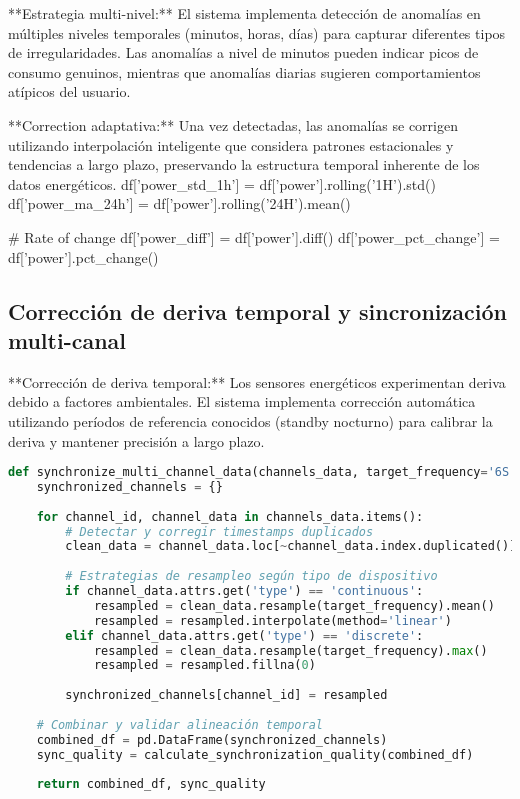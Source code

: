 **Estrategia multi-nivel:** El sistema implementa detección de anomalías en múltiples niveles temporales (minutos, horas, días) para capturar diferentes tipos de irregularidades. Las anomalías a nivel de minutos pueden indicar picos de consumo genuinos, mientras que anomalías diarias sugieren comportamientos atípicos del usuario.

**Correction adaptativa:** Una vez detectadas, las anomalías se corrigen utilizando interpolación inteligente que considera patrones estacionales y tendencias a largo plazo, preservando la estructura temporal inherente de los datos energéticos.
    df['power_std_1h'] = df['power'].rolling('1H').std()
    df['power_ma_24h'] = df['power'].rolling('24H').mean()
    
    # Rate of change
    df['power_diff'] = df['power'].diff()
    df['power_pct_change'] = df['power'].pct_change()
\subsection{Corrección de deriva temporal y sincronización multi-canal}

**Corrección de deriva temporal:** Los sensores energéticos experimentan deriva debido a factores ambientales. El sistema implementa corrección automática utilizando períodos de referencia conocidos (standby nocturno) para calibrar la deriva y mantener precisión a largo plazo.

\begin{lstlisting}[language=Python, caption=Pipeline de sincronización temporal]
def synchronize_multi_channel_data(channels_data, target_frequency='6S'):
    synchronized_channels = {}
    
    for channel_id, channel_data in channels_data.items():
        # Detectar y corregir timestamps duplicados
        clean_data = channel_data.loc[~channel_data.index.duplicated()]
        
        # Estrategias de resampleo según tipo de dispositivo
        if channel_data.attrs.get('type') == 'continuous':
            resampled = clean_data.resample(target_frequency).mean()
            resampled = resampled.interpolate(method='linear')
        elif channel_data.attrs.get('type') == 'discrete':
            resampled = clean_data.resample(target_frequency).max()
            resampled = resampled.fillna(0)
        
        synchronized_channels[channel_id] = resampled
    
    # Combinar y validar alineación temporal
    combined_df = pd.DataFrame(synchronized_channels)
    sync_quality = calculate_synchronization_quality(combined_df)
    
    return combined_df, sync_quality
\end{lstlisting}

